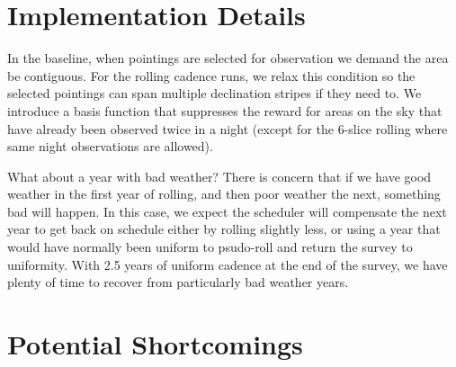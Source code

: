 \documentclass[modern]{aastex62}
\begin{document}
\section{Implementation Details}


In the baseline, when pointings are selected for observation we demand the area be contiguous. For the rolling cadence runs, we relax this condition so the selected pointings can span multiple declination stripes if they need to.  We introduce a basis function that suppresses the reward for areas on the sky that have already been observed twice in a night (except for the 6-slice rolling where same night observations are allowed).

What about a year with bad weather? There is concern that if we have good weather in the first year of rolling, and then poor weather the next, something bad will happen. In this case, we expect the scheduler will compensate the next year to get back on schedule either by rolling slightly less, or using a year that would have normally been uniform to psudo-roll and return the survey to uniformity. With 2.5 years of uniform cadence at the end of the survey, we have plenty of time to recover from particularly bad weather years.



\section{Potential Shortcomings}
\end{document}
